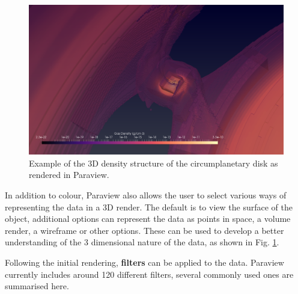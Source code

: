 \documentclass[preprint2]{aastex62}
\begin{document}
\begin{figure}
	\centering
	\includegraphics[width=\linewidth]{figures/DensityStructure3D.png}
	\caption{\label{fig:d3d} Example of the 3D density structure of the circumplanetary disk as rendered in Paraview.}
\end{figure}

In addition to colour, Paraview also allows the user to select various ways of representing the data in a 3D render. The default is to view the surface of the object, additional options can represent the data as points in space, a volume render, a wireframe or other options. These can be used to develop a better understanding of the 3 dimensional nature of the data, as shown in Fig. \ref{fig:d3d}.

Following the initial rendering, \textbf{filters} can be applied to the data.
Paraview currently includes around 120 different filters, several commonly used ones are summarised here.
\end{document}

